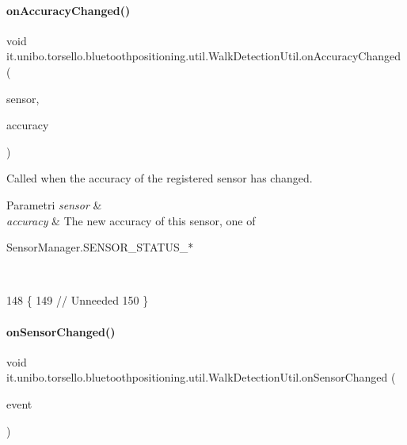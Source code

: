 \paragraph{\texorpdfstring{on\+Accuracy\+Changed()}{onAccuracyChanged()}}
{\footnotesize\ttfamily void it.\+unibo.\+torsello.\+bluetoothpositioning.\+util.\+Walk\+Detection\+Util.\+on\+Accuracy\+Changed (\begin{DoxyParamCaption}\item[{Sensor}]{sensor,  }\item[{int}]{accuracy }\end{DoxyParamCaption})}

Called when the accuracy of the registered sensor has changed.


\begin{DoxyParams}{Parametri}
{\em sensor} & \\
\hline
{\em accuracy} & The new accuracy of this sensor, one of 
\begin{DoxyCode}
SensorManager.SENSOR\_STATUS\_* 
\end{DoxyCode}
 \\
\hline
\end{DoxyParams}

\begin{DoxyCode}
148                                                                \{
149         \textcolor{comment}{// Unneeded}
150     \}
\end{DoxyCode}
\hypertarget{classit_1_1unibo_1_1torsello_1_1bluetoothpositioning_1_1util_1_1WalkDetectionUtil_afb90996da1aa56e5a9ffcad5269eaf1c_afb90996da1aa56e5a9ffcad5269eaf1c}{}\label{classit_1_1unibo_1_1torsello_1_1bluetoothpositioning_1_1util_1_1WalkDetectionUtil_afb90996da1aa56e5a9ffcad5269eaf1c_afb90996da1aa56e5a9ffcad5269eaf1c} 
\paragraph{\texorpdfstring{on\+Sensor\+Changed()}{onSensorChanged()}}
{\footnotesize\ttfamily void it.\+unibo.\+torsello.\+bluetoothpositioning.\+util.\+Walk\+Detection\+Util.\+on\+Sensor\+Changed (\begin{DoxyParamCaption}\item[{Sensor\+Event}]{event }\end{DoxyParamCaption})}

